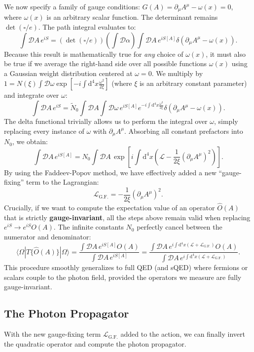We now specify a family of gauge conditions: $G(A) = \partial_\mu A^\mu - \omega(x) = 0$, where $\omega(x)$ is an arbitrary scalar function. The determinant remains $\det(\square/e)$. The path integral evaluates to:
\[
    \int \mathcal{D}A \, e^{iS} = (\det (\square/e))\left( \int \mathcal{D}\alpha \right) \int \mathcal{D}A \, e^{iS[A]} \delta(\partial_\mu A^\mu - \omega(x)).
\]
Because this result is mathematically true for \textit{any} choice of $\omega(x)$, it must also be true if we average the right-hand side over all possible functions $\omega(x)$ using a Gaussian weight distribution centered at $\omega = 0$. We multiply by $1 = N(\xi) \int \mathcal{D}\omega \exp\left[ -i \int \mathrm{d}^4x \frac{\omega^2}{2\xi} \right]$ (where $\xi$ is an arbitrary constant parameter) and integrate over $\omega$:
\[
    \int \mathcal{D}A \, e^{iS} = \tilde{N}_0 \int \mathcal{D}A \int \mathcal{D}\omega \, e^{iS[A]} e^{-i \int \mathrm{d}^4x \frac{\omega^2}{2\xi}} \delta(\partial_\mu A^\mu - \omega(x)).
\]
The delta functional trivially allows us to perform the integral over $\omega$, simply replacing every instance of $\omega$ with $\partial_\mu A^\mu$. Absorbing all constant prefactors into $N_0$, we obtain:
\[
    \int \mathcal{D}A \, e^{iS[A]} = N_0 \int \mathcal{D}A \, \exp\left[ i \int \mathrm{d}^4x \left( \mathcal{L} - \frac{1}{2\xi} (\partial_\mu A^\mu)^2 \right) \right].
\]
By using the Faddeev-Popov method, we have effectively added a new ``gauge-fixing'' term to the Lagrangian:
\[
    \mathcal{L}_{\text{G.F.}} = -\frac{1}{2\xi} (\partial_\mu A^\mu)^2.
\]
Crucially, if we want to compute the expectation value of an operator $\hat{O}(A)$ that is strictly \textbf{gauge-invariant}, all the steps above remain valid when replacing $e^{iS} \to e^{iS}O(A)$. The infinite constants $N_0$ perfectly cancel between the numerator and denominator:
\[
    \langle \Omega | T \{ \hat{O}(A) \} | \Omega \rangle = \frac{\int \mathcal{D}A \, e^{i S[A]} O(A)}{\int \mathcal{D}A \, e^{i S[A]}} = \frac{\int \mathcal{D}A \, e^{i \int \mathrm{d}^4x ( \mathcal{L} + \mathcal{L}_{\text{G.F.}} )} O(A)}{\int \mathcal{D}A \, e^{i \int \mathrm{d}^4x ( \mathcal{L} + \mathcal{L}_{\text{G.F.}} )}}.
\]
This procedure smoothly generalizes to full QED (and sQED) where fermions or scalars couple to the photon field, provided the operators we measure are fully gauge-invariant.

\subsection{The Photon Propagator}
With the new gauge-fixing term $\mathcal{L}_{\text{G.F.}}$ added to the action, we can finally invert the quadratic operator and compute the photon propagator.

